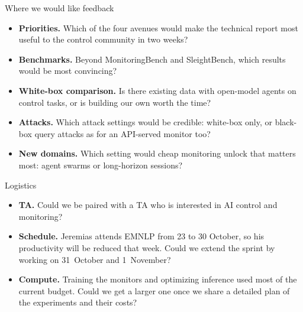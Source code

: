 \begin{frame}{Where we would like feedback}
    \begin{itemize}
        \item \textbf{Priorities.} Which of the four avenues would make the technical report most
              useful to the control community in two weeks?
        \item \textbf{Benchmarks.} Beyond MonitoringBench and SleightBench, which results would
              be most convincing?
        \item \textbf{White-box comparison.} Is there existing data with open-model agents on
              control tasks, or is building our own worth the time?
        \item \textbf{Attacks.} Which attack settings would be credible: white-box only, or
              black-box query attacks as for an API-served monitor too?
        \item \textbf{New domains.} Which setting would cheap monitoring unlock that matters
              most: agent swarms or long-horizon sessions?
    \end{itemize}
\end{frame}

\begin{frame}{Logistics}
    \begin{itemize}
        \item \textbf{TA.} Could we be paired with a TA who is interested in AI control
              and monitoring?
        \item \textbf{Schedule.} Jeremias attends EMNLP from 23 to 30 October, so his
              productivity will be reduced that week. Could we extend the sprint by working
              on 31~October and 1~November?
        \item \textbf{Compute.} Training the monitors and optimizing inference used most
              of the current budget. Could we get a larger one once we share a detailed
              plan of the experiments and their costs?
    \end{itemize}
\end{frame}
